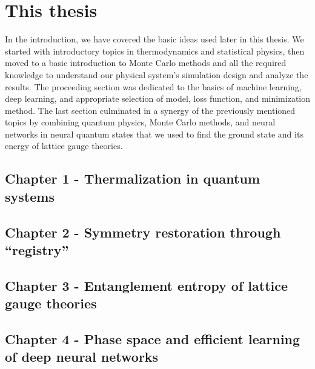 \section{This thesis}
In the introduction, we have covered the basic ideas used later in this thesis. We started with introductory topics in thermodynamics and statistical physics, then moved to a basic introduction to Monte Carlo methods and all the required knowledge to understand our physical system's simulation design and analyze the results. The proceeding section was dedicated to the basics of machine learning, deep learning, and appropriate selection of model, loss function, and minimization method. The last section culminated in a synergy of the previously mentioned topics by combining quantum physics, Monte Carlo methods, and neural networks in neural quantum states that we used to find the ground state and its energy of lattice gauge theories.

\subsection{Chapter 1 - Thermalization in quantum systems}


\subsection{Chapter 2 - Symmetry restoration through ``registry''}

\subsection{Chapter 3 - Entanglement entropy of lattice gauge theories}


\subsection{Chapter 4 - Phase space and efficient learning of deep neural networks}

